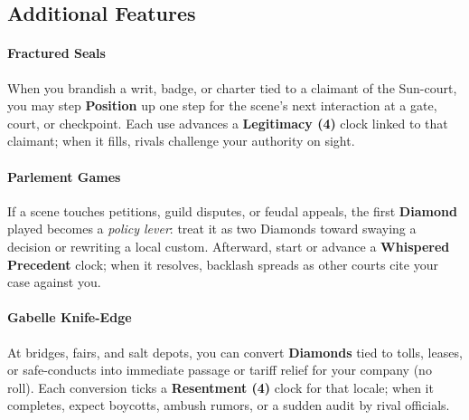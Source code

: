 \subsection*{Additional Features}
\label{sec:vhasia-features}

\paragraph{Fractured Seals}
When you brandish a writ, badge, or charter tied to a claimant of the Sun-court, you may step \textbf{Position} up one step for the scene’s next interaction at a gate, court, or checkpoint. Each use advances a \textbf{Legitimacy (4)} clock linked to that claimant; when it fills, rivals challenge your authority on sight.

\paragraph{Parlement Games}
If a scene touches petitions, guild disputes, or feudal appeals, the first \textbf{Diamond} played becomes a \emph{policy lever}: treat it as two Diamonds toward swaying a decision or rewriting a local custom. Afterward, start or advance a \textbf{Whispered Precedent} clock; when it resolves, backlash spreads as other courts cite your case against you.

\paragraph{Gabelle Knife-Edge}
At bridges, fairs, and salt depots, you can convert \textbf{Diamonds} tied to tolls, leases, or safe-conducts into immediate passage or tariff relief for your company (no roll). Each conversion ticks a \textbf{Resentment (4)} clock for that locale; when it completes, expect boycotts, ambush rumors, or a sudden audit by rival officials.

